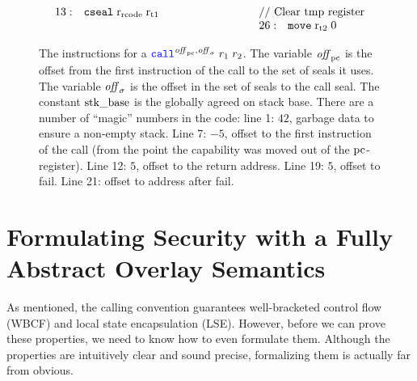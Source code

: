 \documentclass[acmsmall,review,showframe]{acmart}\settopmatter{printfolios=true,printccs=false,printacmref=false}
\renewcommand{\rretc}{\mathrm{r}_{\mathrm{rcode}}}
\begin{document}
\begin{figure}[htb]
{\[\begin{array}{r >{$}p{5.1cm}<{$} r l}
13:& \tcseal{\rretc}{\rtmp{1}}                                   &\multicolumn{2}{l}{\text{// Clear tmp register}}\\
      &    &26: & \tmove{\rtmp{2}}{0}\\
  \end{array}
\]
}
\caption{
  The instructions for a $\scall{\offpc,\offsigma}{r_1}{r_2}$.
  The variable $\mathit{off}_{\mathrm{pc}}$ is the offset from the first instruction of the call to the set of seals it uses.
  The variable $\mathit{off}_\sigma$ is the offset in the set of seals to the call seal.
  The constant $\mathrm{stk\_base}$ is the globally agreed on stack base.
  There are a number of ``magic'' numbers in the code: line 1: $42$, garbage data to ensure a non-empty stack.
  Line 7: $-5$, offset to the first instruction of the call (from the point the capability was moved out of the $\mathrm{pc}$-register).
  Line 12: $5$, offset to the return address.
  Line 19: $5$, offset to fail.
  Line 21: offset to address after fail.
}
  \label{fig:call-code}
\end{figure}



\section{Formulating Security with a Fully Abstract Overlay Semantics}
\label{sec:form-secur-with}
As mentioned, the \stktokens{} calling convention guarantees well-bracketed control flow (WBCF) and local state encapsulation (LSE).
However, before we can prove these properties, we need to know how to even formulate them.
Although the properties are intuitively clear and sound precise, formalizing them is actually far from obvious.
\end{document}
